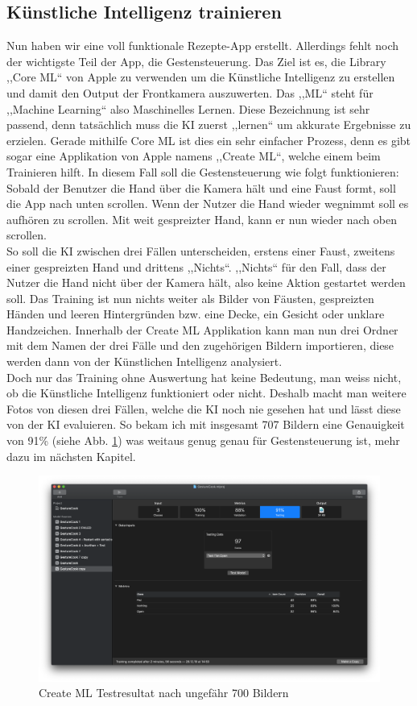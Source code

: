 \documentclass[12pt]{article}
\begin{document}
\subsection{Künstliche Intelligenz trainieren}
Nun haben wir eine voll funktionale Rezepte-App erstellt. Allerdings fehlt noch der wichtigste Teil der App, die Gestensteuerung. Das Ziel ist es, die Library ,,Core ML`` von Apple zu verwenden um die Künstliche Intelligenz zu erstellen und damit den Output der Frontkamera auszuwerten. Das ,,ML`` steht für ,,Machine Learning`` also Maschinelles Lernen. Diese Bezeichnung ist sehr passend, denn tatsächlich muss die KI zuerst ,,lernen`` um akkurate Ergebnisse zu erzielen. Gerade mithilfe Core ML ist dies ein sehr einfacher Prozess, denn es gibt sogar eine Applikation von Apple namens ,,Create ML``, welche einem beim Trainieren hilft. In diesem Fall soll die Gestensteuerung wie folgt funktionieren: Sobald der Benutzer die Hand über die Kamera hält und eine Faust formt, soll die App nach unten scrollen. Wenn der Nutzer die Hand wieder wegnimmt soll es aufhören zu scrollen. Mit weit gespreizter Hand, kann er nun wieder nach oben scrollen. \\ So soll die KI zwischen drei Fällen unterscheiden, erstens einer Faust, zweitens einer gespreizten Hand und drittens ,,Nichts``. ,,Nichts`` für den  Fall, dass der Nutzer die Hand nicht über der Kamera hält, also keine Aktion gestartet werden soll. Das Training ist nun nichts weiter als Bilder von Fäusten, gespreizten Händen und leeren Hintergründen bzw. eine Decke, ein Gesicht oder unklare Handzeichen. Innerhalb der Create ML Applikation kann man nun drei Ordner mit dem Namen der drei Fälle und den zugehörigen Bildern importieren, diese werden dann von der Künstlichen Intelligenz analysiert. \\ Doch nur das Training ohne Auswertung hat keine Bedeutung, man weiss nicht, ob die Künstliche Intelligenz funktioniert oder nicht. Deshalb macht man weitere Fotos von diesen drei Fällen, welche die KI noch nie gesehen hat und lässt diese von der KI evaluieren. So bekam ich mit insgesamt 707 Bildern eine Genauigkeit von 91\% (siehe Abb. \ref{fig:createML}) was weitaus genug genau für Gestensteuerung ist, mehr dazu im nächsten Kapitel. \cite{gesturecontrolvideo}
\begin{figure}
    \includegraphics[width=\linewidth]{pictures/CreateML.png}
    \caption{Create ML Testresultat nach ungefähr 700 Bildern}
    \label{fig:createML}
\end{figure}
\end{document}
